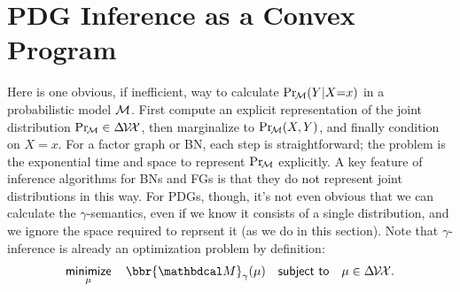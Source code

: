 \documentclass{article}
\newcommand\discard[1]{}
\begin{document}
\section{PDG Inference as a Convex Program}
    \label{sec:inf-as-cvx-program}

Here is one obvious, if inefficient, way to calculate $\Pr_{\!\cal M}(Y|X{=}x)$ in a
probabilistic model $\cal M$. 
First compute an explicit representation of the joint distribution 
$\Pr_{\!\cal M} \in \Delta\mskip-2mu\mathcal V\!\mathcal X$, 
then marginalize to $\Pr_{\!\cal M}(X,Y)$, and finally condition on $X{=}x$.
%
For a factor graph or BN,
each step is
straightforward;
the problem is the exponential time and space to represent $\Pr_{\!\cal M}$ explicitly.
A key feature of inference algorithms for BNs and FGs is that they
do not represent joint distributions in this way.
%
For PDGs, though, it's not even obvious that
we can calculate the $\gamma$-semantics,
even if
we know it consists of a single distribution, and
we ignore the space required to reprsent it (as we do in this section).
Note that $\gamma$-inference is already an optimization problem by definition:
\[
    \mathop{\text{\sf minimize}}\limits_\mu\quad
        \bbr{\dg M}_\gamma(\mu)
    \quad \text{\sf subject to}\quad \mu \in \Delta\mskip-2mu\V\mskip-2mu\X.
\]
\end{document}
